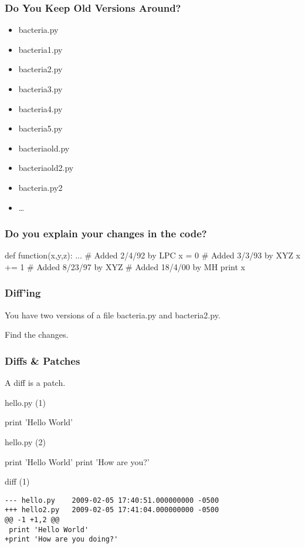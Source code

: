 \begin{frame}[fragile]
\frametitle{Do You Keep Old Versions Around?}
\begin{itemize}
\item bacteria.py
\item bacteria1.py
\item bacteria2.py
\item bacteria3.py
\item bacteria4.py
\item bacteria5.py
\item bacteriaold.py
\item bacteriaold2.py
\item bacteria.py2
\item \ldots
\end{itemize}
\end{frame}

\begin{frame}[fragile]
\frametitle{Do you explain your changes in the code?}

\begin{python}
def function(x,y,z):
    ...
    # Added 2/4/92 by LPC
    x = 0
    # Added 3/3/93 by XYZ
    x += 1
    # Added 8/23/97 by XYZ
    # Added 18/4/00 by MH
    print x
\end{python}
\end{frame}

\begin{frame}[fragile]
\frametitle{Diff'ing}

You have two versions of a file bacteria.py and bacteria2.py.

\bigskip
Find the changes.

\end{frame}
\begin{frame}[fragile]
\frametitle{Diffs \& Patches}

A diff is a patch.

\end{frame}

\begin{frame}[fragile]

\begin{block}{hello.py (1)}
\begin{python}
print 'Hello World'
\end{python}
\end{block}

\begin{block}{hello.py (2)}
\begin{python}
print 'Hello World'
print 'How are you?'
\end{python}
\end{block}

\begin{block}{diff (1)}
\begin{verbatim}
--- hello.py    2009-02-05 17:40:51.000000000 -0500
+++ hello2.py   2009-02-05 17:41:04.000000000 -0500
@@ -1 +1,2 @@
 print 'Hello World'
+print 'How are you doing?'
\end{verbatim}
\end{block}
\end{frame}

